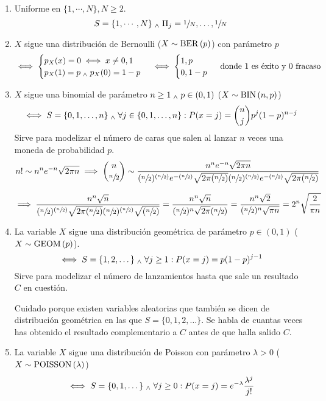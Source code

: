 \begin{ejem}[Dados]
	\begin{enumerate}
		\item Uniforme en $\{1, \cdots, N\}, N\geq2$.
		\[S=\{1, \cdots, N\} \; _{\wedge} \; {\Pi_j}={\sfrac{1}{N}, \dots, \sfrac{1}{N}}\]
		\item $X$ sigue una distribución de Bernoulli ($X\sim\operatorname{BER}\left(p\right)$) con parámetro $p$
		\[\iff \begin{cases}
			p_X(x)=0 \iff x\ne 0, 1 \\
			p_X(1)=p \; _{\wedge} \; p_X(0)=1-p
		\end{cases}\iff\begin{cases}
			1, p\\
			0, 1-p
		\end{cases}\text{ donde $1$ es éxito y $0$ fracaso}\]
		\item $X$ sigue una binomial de parámetro $n\geq 1 \; _{\wedge} \; p\in (0, 1)$ ($X\sim\operatorname{BIN}\left(n, p\right)$)
		\[\iff S=\{0, 1, \dots, n\} \; _{\wedge} \; \forall j\in \{0, 1, \dots, n\}:P(x=j)=\binom{n}{j}p^j(1-p)^{n-j}\]
		Sirve para modelizar el número de caras que salen al lanzar $n$ veces una moneda de probabilidad $p$.
		\[n! \sim n^ne^{-n}\sqrt{2\pi n}\implies \binom{n}{\sfrac{n}{2}}\sim\frac{n^ne^{-n}\sqrt{2\pi n}}{(\sfrac{n}        {2})^{(\sfrac{n}{2})}e^{-(\sfrac{n}{2})}\sqrt{2\pi (\sfrac{n}{2})}(\sfrac{n}{2})^{(\sfrac{n}{2})}e^{-(\sfrac{n}     {2})}\sqrt{2\pi (\sfrac{n}{2})}}\]
		
		\[\implies \frac{n^n\sqrt{n}}{(\sfrac{n}{2})^{(\sfrac{n}{2})}\sqrt{2\pi (\sfrac{n}{2})}(\sfrac{n}{2})^{(\sfrac{n}       {2})}\sqrt{(\sfrac{n}{2})}} = 
		\frac{n^n\sqrt{n}}
		{(\sfrac{n}{2})^{n}\sqrt{2\pi}(\sfrac{n}        {2})}=\frac{n^n\sqrt{2}}{(\sfrac{n}{2})^n\sqrt{\pi      n}}=2^n\sqrt{\frac{2}{\pi n}}\]
		\item La variable $X$ sigue una distribución geométrica de parámetro $p\in(0,1)$ ($X\sim\operatorname{GEOM}\left(p\right)$).
		\[\iff S=\{1, 2, \dots\} \; _{\wedge} \; \forall j \geq 1 : P(x=j)=p(1-p)^{j-1}\]
		Sirve para modelizar el número de lanzamientos hasta que sale un resultado $C$ en cuestión.
		\begin{obs}
			Cuidado porque existen variables aleatorias que también se dicen de distribución geométrica en las que $S=\{0, 1, 2, \dots\}$. Se habla de cuantas veces has obtenido el resultado complementario a $C$ antes de que halla salido $C$.
		\end{obs}
		\item La variable $X$ sigue una distribución de Poisson con parámetro $\lambda>0$ ($X\sim \operatorname{POISSON}\left(\lambda\right)$)
		\[\iff S=\{0, 1, \dots\} \; _{\wedge} \; \forall j \geq 0 : P(x=j)=e^{-\lambda}\frac{\lambda^j}{j!}\]
	\end{enumerate}
\end{ejem}

